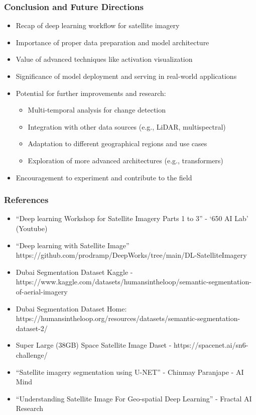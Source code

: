 \begin{frame}[fragile]\frametitle{Conclusion and Future Directions}
\begin{itemize}
\item Recap of deep learning workflow for satellite imagery
\item Importance of proper data preparation and model architecture
\item Value of advanced techniques like activation visualization
\item Significance of model deployment and serving in real-world applications
\item Potential for further improvements and research:
  \begin{itemize}
  \item Multi-temporal analysis for change detection
  \item Integration with other data sources (e.g., LiDAR, multispectral)
  \item Adaptation to different geographical regions and use cases
  \item Exploration of more advanced architectures (e.g., transformers)
  \end{itemize}
\item Encouragement to experiment and contribute to the field
\end{itemize}
\end{frame}

\begin{frame}[fragile]\frametitle{References}
		\begin{itemize}
		\item ``Deep learning Workshop for Satellite Imagery Parts 1 to 3'' - `650 AI Lab' (Youtube)
		\item ``Deep learning with Satellite Image'' https://github.com/prodramp/DeepWorks/tree/main/DL-SatelliteImagery
		\item Dubai Segmentation Dataset Kaggle - https://www.kaggle.com/datasets/humansintheloop/semantic-segmentation-of-aerial-imagery
		\item Dubai Segmentation Dataset Home: https://humansintheloop.org/resources/datasets/semantic-segmentation-dataset-2/
		\item Super Large (38GB) Space Satellite Image Daset - https://spacenet.ai/sn6-challenge/
		\item ``Satellite imagery segmentation using U-NET'' - Chinmay Paranjape - AI Mind
		\item ``Understanding Satellite Image For Geo-spatial Deep Learning'' - Fractal AI Research
		\end{itemize}
\end{frame}



